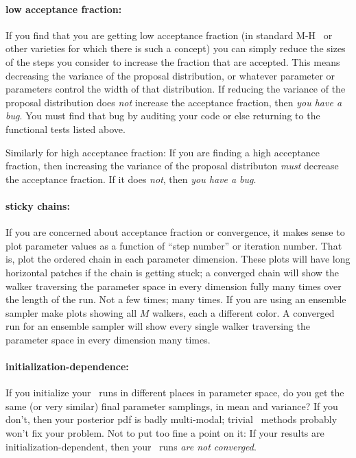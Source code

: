 \documentclass[modern]{aastex61}
\newcommand{\MCMC}{\acronym{MCMC}}
\begin{document}
\paragraph{low acceptance fraction:}
If you find that you are getting low acceptance fraction
  (in standard M-H \MCMC\ or other varieties for which there is such a concept)
  you can simply reduce the sizes of the steps you consider to increase the fraction that are accepted.
This means decreasing the variance of the proposal distribution,
  or whatever parameter or parameters control the width of that distribution.
If reducing the variance of the proposal distribution does \emph{not}
increase the acceptance fraction, then \emph{you have a bug}.
You must find that bug by auditing your code or else returning to the
functional tests listed above.

Similarly for high acceptance fraction:
If you are finding a high acceptance fraction, then increasing the
variance of the proposal distributon \emph{must} decrease the
acceptance fraction.
If it does \emph{not}, then \emph{you have a bug}.

\paragraph{sticky chains:}
If you are concerned about acceptance fraction or convergence,
  it makes sense to plot parameter values as a function of ``step number'' or iteration number.
That is, plot the ordered chain in each parameter dimension.
These plots will have long horizontal patches if the chain is getting stuck;
  a converged chain will show the walker traversing the parameter space in every dimension fully many times
  over the length of the run.
Not a few times; many times.
If you are using an ensemble sampler
  make plots showing all $M$ walkers, each a different color.
A converged run for an ensemble sampler will show every single walker traversing the parameter space
  in every dimension many times.

\paragraph{initialization-dependence:}
If you initialize your \MCMC\ runs in different places in parameter space,
  do you get the same (or very similar) final parameter samplings,
  in mean and variance?
If you don't,
  then your posterior pdf is badly multi-modal;
  trivial \MCMC\ methods probably won't fix your problem.
Not to put too fine a point on it:
If your results are initialization-dependent,
  then your \MCMC\ runs \emph{are not converged}.
\end{document}
